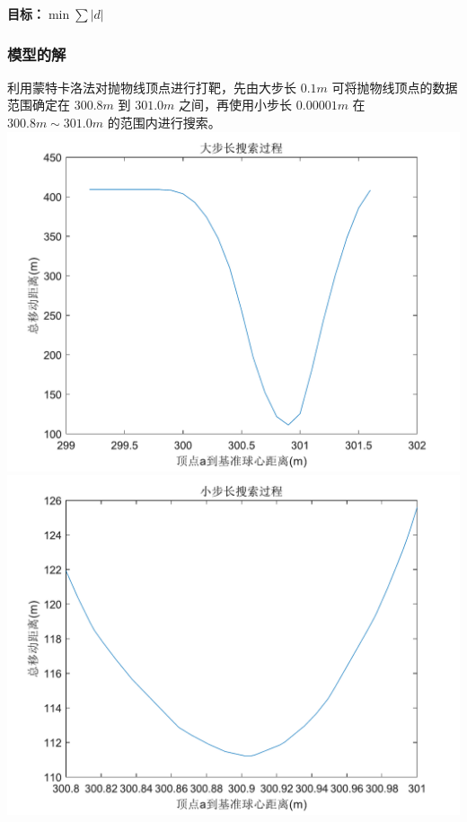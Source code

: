 \documentclass[withoutpreface,bwprint]{cumcmthesis} %
\begin{document}
\medskip
\textbf{目标：$\min\sum |d|$}
\subsubsection{模型的解}
利用蒙特卡洛法对抛物线顶点进行打靶，先由大步长 $0.1m$ 可将抛物线顶点的数据范围确定在 $300.8m$
到 $301.0m$ 之间，再使用小步长 $0.00001m$ 在 $300.8m \sim 301.0m$ 的范围内进行搜索。\\
    {\centering
    \includegraphics[scale=0.8]{大步长搜索过程.pdf}}
\\
    {\centering
    \includegraphics[scale=0.8]{小步长搜索过程.pdf}}
\\
\end{document}
